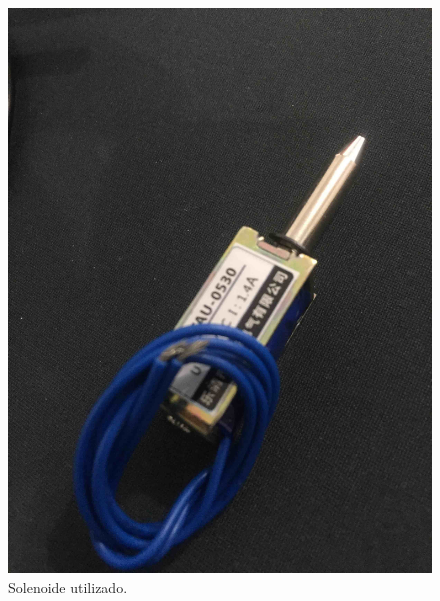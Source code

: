 \begin{figure}[!h]
            \centering
         	\includegraphics[scale= 0.06]{figuras/solenoide.jpg}
            \caption{Solenoide utilizado.}
            \label{solenoide}
\end{figure}

	

